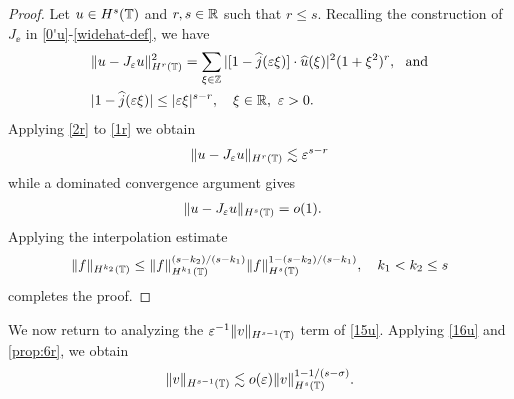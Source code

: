 \begin{proof}
Let $u \in H^s(\mathbb{T})$ and $r, s \in \mathbb{R}$ such that $r \le s$. 
Recalling the construction of $J_\ee$ in
\eqref{0'u}-\eqref{widehat-def}, we have
%
%
\begin{align}
\label{1r}
& \|u - J_\varepsilon u\|_{H^r(\mathbb{T})}^2 = \sum_{\xi \in \mathbb{Z}} | [1- \widehat{j}(\varepsilon 
\xi)] \cdot \widehat{u}(\xi) |^2
(1+\xi^2)^r, \ \ \text{and}
\\
& |1 - \widehat{j}(\varepsilon \xi)| \le |\varepsilon \xi |^{s-r}, \quad 
\xi \in \mathbb{R}, \ \varepsilon > 0.
\label{2r}
\end{align}
%
%
Applying \eqref{2r} to \eqref{1r} we obtain
%
%
\begin{equation*}
\label{2pr}
\begin{split}
\|u - J_\varepsilon u\|_{H^r(\mathbb{T})}
\lesssim \varepsilon^{s-r}
\end{split}
\end{equation*}
%
%
%
%
while a dominated convergence argument gives
%
%
\begin{equation*}
\label{o1}
\begin{split}
\|u - J_\varepsilon u \|_{H^s(\mathbb{T}) } & = o(1).
\end{split}
\end{equation*}
%
%
%
%
Applying the interpolation estimate 
%
%
\begin{equation}
\begin{split}
\|f\|_{H^{k_2}(\mathbb{T})} \le
\|f\|_{H^{k_1}(\mathbb{T})}^{(s-k_2)/(s -k_1 )}
\|f\|_{H^s(\mathbb{T})}^{1 - (s-k_2)/(s -k_1 )}, \quad k_1 < k_2 \le s
\label{16u}
\end{split}
\end{equation}
%
%
%
%
%
%
completes the proof. 
%
\end{proof}
We now return to analyzing the $\varepsilon^{-1}
\|v\|_{H^{s-1}(\mathbb{T})} $ term of \eqref{15u}.
Applying \eqref{16u} and \cref{prop:6r}, 
we obtain
%
%
%
%
$$
\|v\|_{H^{s-1}(\mathbb{T})}  \lesssim o(\varepsilon) 
\|v\|_{H^s(\mathbb{T})}^{1-
1/(s- \sigma)}.
$$

